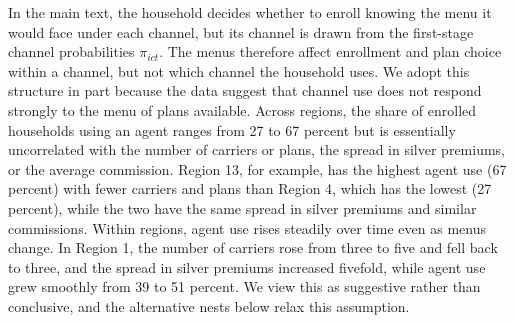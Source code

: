 \documentclass[12pt]{article}
\begin{document}
In the main text, the household decides whether to enroll knowing the menu it would face under each channel, but its channel is drawn from the first-stage channel probabilities $\pi_{ict}$. The menus therefore affect enrollment and plan choice within a channel, but not which channel the household uses. We adopt this structure in part because the data suggest that channel use does not respond strongly to the menu of plans available. Across regions, the share of enrolled households using an agent ranges from 27 to 67 percent but is essentially uncorrelated with the number of carriers or plans, the spread in silver premiums, or the average commission. Region 13, for example, has the highest agent use (67 percent) with fewer carriers and plans than Region 4, which has the lowest (27 percent), while the two have the same spread in silver premiums and similar commissions. Within regions, agent use rises steadily over time even as menus change. In Region 1, the number of carriers rose from three to five and fell back to three, and the spread in silver premiums increased fivefold, while agent use grew smoothly from 39 to 51 percent. We view this as suggestive rather than conclusive, and the alternative nests below relax this assumption.
\end{document}
